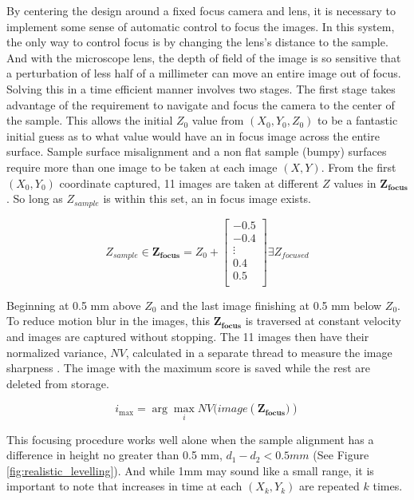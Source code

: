\documentclass[a4paper,12pt]{article}
\begin{document}
By centering the design around a fixed focus camera and lens, it is necessary to implement some sense of automatic control to focus the images. 
In this system, the only way to control focus is by changing the lens's distance to the sample. 
And with the microscope lens, the depth of field of the image is so sensitive that a perturbation of less half of a millimeter can move an entire image out of focus.
Solving this in a time efficient manner involves two stages. 
The first stage takes advantage of the requirement to navigate and focus the camera to the center of the sample.
This allows the initial $Z_0$ value from $(X_0, Y_0, Z_0)$ to be a fantastic initial guess as to what value would have an in focus image across the entire surface. 
Sample surface misalignment and a non flat sample (bumpy) surfaces require more than one image to be taken at each image $(X, Y)$. 
From the first $(X_0, Y_0)$ coordinate captured, 11 images are taken at different $Z$ values in $\boldsymbol{Z_{\text{focus}}}$. 
So long as $Z_{sample}$ is within this set, an in focus image exists.

\[
Z_{sample} \in
\boldsymbol{Z_{\text{focus}}} = 
Z_0 + 
\begin{bmatrix}
-0.5 \\
-0.4 \\
\vdots \\
0.4 \\
0.5 \\
\end{bmatrix}
\exists 
Z_{focused}
\] %

Beginning at 0.5 mm above $Z_0$ and the last image finishing at 0.5 mm below $Z_0$.
To reduce motion blur in the images, this $\boldsymbol{Z_{\text{focus}}}$ is traversed at constant velocity and images are captured without stopping. 
The 11 images then have their normalized variance, $NV$, calculated in a separate thread to measure the image sharpness \citep{sampat_extensive_2014}.
The image with the maximum score is saved while the rest are deleted from storage.

\[
    i_{\max} = \arg\max_{i} NV(image(\boldsymbol{{Z_\text{focus}})})
\]
    
This focusing procedure works well alone when the sample alignment has a difference in height no greater than 0.5 mm, $d_1 - d_2 < 0.5 mm $ (See Figure \ref{fig:realistic_levelling}). 
And while 1mm may sound like a small range, it is important to note that increases in time at each $(X_k, Y_k)$ are repeated $k$ times. 
\end{document}
